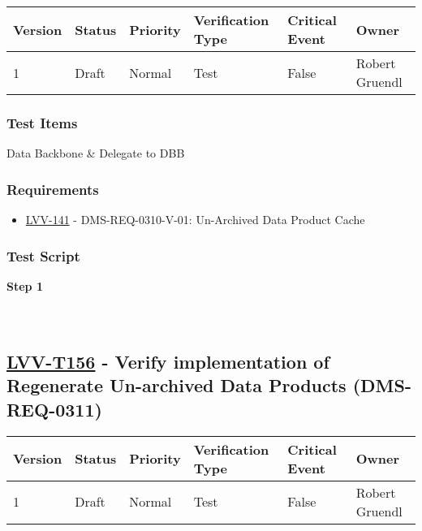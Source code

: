 \begin{longtable}[]{@{}llllll@{}}
\toprule
Version & Status & Priority & Verification Type & Critical Event &
Owner\tabularnewline
\midrule
\endhead
1 & Draft & Normal & Test & False & Robert Gruendl\tabularnewline
\bottomrule
\end{longtable}

\hypertarget{test-items-131}{%
\subsubsection{Test Items}\label{test-items-131}}

Data Backbone \& Delegate to DBB

\hypertarget{requirements-132}{%
\subsubsection{Requirements}\label{requirements-132}}

\begin{itemize}
\tightlist
\item
  \href{https://jira.lsstcorp.org/browse/LVV-141}{LVV-141} -
  DMS-REQ-0310-V-01: Un-Archived Data Product Cache
\end{itemize}

\hypertarget{test-script-132}{%
\subsubsection{Test Script}\label{test-script-132}}

\textbf{Step 1}\\
~\\
~\\

\hypertarget{lvv-t156---verify-implementation-of-regenerate-un-archived-data-products-dms-req-0311}{%
\subsection{\texorpdfstring{\href{https://jira.lsstcorp.org/secure/Tests.jspa\#/testCase/LVV-T156}{LVV-T156}
- Verify implementation of Regenerate Un-archived Data Products
(DMS-REQ-0311)}{LVV-T156 - Verify implementation of Regenerate Un-archived Data Products (DMS-REQ-0311)}}\label{lvv-t156---verify-implementation-of-regenerate-un-archived-data-products-dms-req-0311}}

\begin{longtable}[]{@{}llllll@{}}
\toprule
Version & Status & Priority & Verification Type & Critical Event &
Owner\tabularnewline
\midrule
\endhead
1 & Draft & Normal & Test & False & Robert Gruendl\tabularnewline
\bottomrule
\end{longtable}

